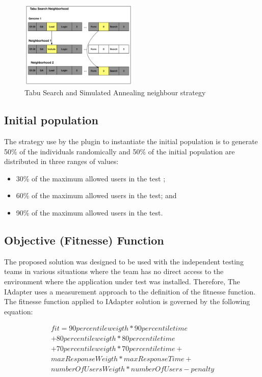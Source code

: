 \begin{figure}[h]
\includegraphics[width=0.5\textwidth]{./images/TabuNE.png}
\caption{Tabu Search and Simulated Annealing neighbour strategy}
\label{fig:neighbourtaby}
\end{figure}


\subsection{Initial population}

The strategy use by the plugin to instantiate the initial population is to generate 50\% of the individuals randomically and 50\% of the initial population are distributed in three  ranges of values:

\begin{itemize}
\item 30\% of the maximum allowed users in the test ;
\item 60\% of the maximum allowed users in the test; and
\item 90\% of the maximum allowed users in the test.
\end{itemize}


\subsection{Objective (Fitnesse) Function}

The proposed solution was designed to be used with the independent testing teams in various situations where the team has no direct access to the environment where the application under test was installed. Therefore,  The IAdapter uses a measurement approach to the definition of the fitnesse function. The fitnesse function applied to IAdapter solution is governed by the following equation:

\begin{equation}
\begin{aligned}
fit=90percentileweigth* 90percentiletime\\
+80percentileweigth*80percentiletime\\+
70percentileweigth*70percentiletime+\\
maxResponseWeigth*maxResponseTime+\\
numberOfUsersWeigth*numberOfUsers-penalty
\end{aligned}
\end{equation}

